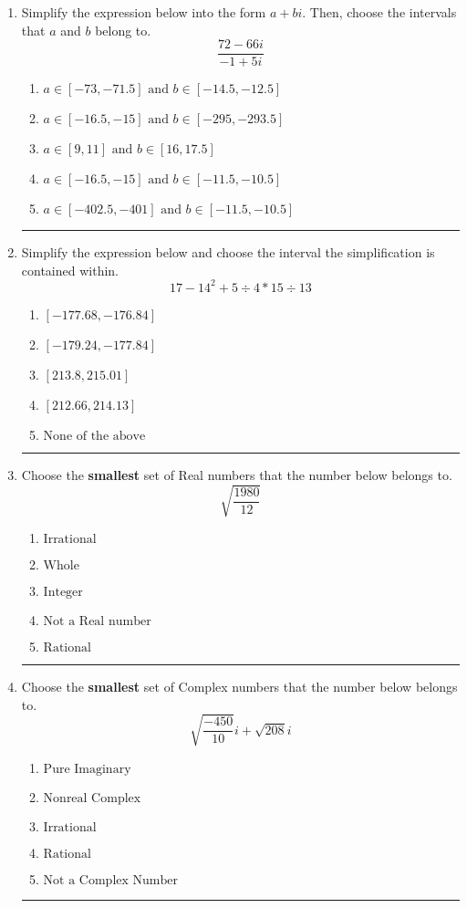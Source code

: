 \documentclass[14pt]{extbook}
\newcommand{\litem}[1]{\item#1\hspace*{-1cm}\rule{\textwidth}{0.4pt}}
\begin{document}
\begin{enumerate}
\litem{
Simplify the expression below into the form $a+bi$. Then, choose the intervals that $a$ and $b$ belong to.\[ \frac{72 - 66 i}{-1 + 5 i} \]\begin{enumerate}[label=\Alph*.]
\item \( a \in [-73, -71.5] \text{ and } b \in [-14.5, -12.5] \)
\item \( a \in [-16.5, -15] \text{ and } b \in [-295, -293.5] \)
\item \( a \in [9, 11] \text{ and } b \in [16, 17.5] \)
\item \( a \in [-16.5, -15] \text{ and } b \in [-11.5, -10.5] \)
\item \( a \in [-402.5, -401] \text{ and } b \in [-11.5, -10.5] \)

\end{enumerate} }
\litem{
Simplify the expression below and choose the interval the simplification is contained within.\[ 17 - 14^2 + 5 \div 4 * 15 \div 13 \]\begin{enumerate}[label=\Alph*.]
\item \( [-177.68, -176.84] \)
\item \( [-179.24, -177.84] \)
\item \( [213.8, 215.01] \)
\item \( [212.66, 214.13] \)
\item \( \text{None of the above} \)

\end{enumerate} }
\litem{
Choose the \textbf{smallest} set of Real numbers that the number below belongs to.\[ \sqrt{\frac{1980}{12}} \]\begin{enumerate}[label=\Alph*.]
\item \( \text{Irrational} \)
\item \( \text{Whole} \)
\item \( \text{Integer} \)
\item \( \text{Not a Real number} \)
\item \( \text{Rational} \)

\end{enumerate} }
\litem{
Choose the \textbf{smallest} set of Complex numbers that the number below belongs to.\[ \sqrt{\frac{-450}{10}} i+\sqrt{208}i \]\begin{enumerate}[label=\Alph*.]
\item \( \text{Pure Imaginary} \)
\item \( \text{Nonreal Complex} \)
\item \( \text{Irrational} \)
\item \( \text{Rational} \)
\item \( \text{Not a Complex Number} \)


\end{enumerate}}
\end{enumerate}
\end{document}
